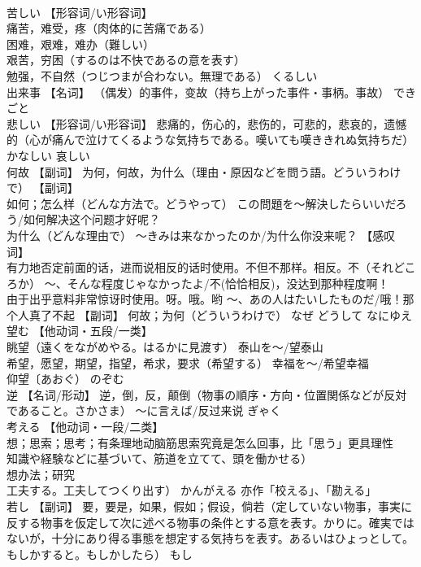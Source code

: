 \documentclass[8pt]{extreport}
\begin{document}
\begin{CJK}{UTF8}{min}
\\	苦しい	【形容词/い形容词】 
\\	痛苦，难受，疼（肉体的に苦痛である） 
\\	困难，艰难，难办（難しい） 
\\	艰苦，穷困（するのは不快であるの意を表す） 
\\	勉强，不自然（つじつまが合わない。無理である）	くるしい	
\\	出来事	【名词】 （偶发）的事件，变故（持ち上がった事件・事柄。事故）	できごと	
\\	悲しい	【形容词/い形容词】 悲痛的，伤心的，悲伤的，可悲的，悲哀的，遗憾的（心が痛んで泣けてくるような気持ちである。嘆いても嘆ききれぬ気持ちだ）	かなしい	哀しい
\\	何故	【副词】 为何，何故，为什么（理由・原因などを問う語。どういうわけで） 【副词】 
\\	如何；怎么样（どんな方法で。どうやって） この問題を～解決したらいいだろう/如何解决这个问题才好呢？ 
\\	为什么（どんな理由で） ～きみは来なかったのか/为什么你没来呢？ 【感叹词】 
\\	有力地否定前面的话，进而说相反的话时使用。不但不那样。相反。不（それどころか） ～、そんな程度じゃなかったよ/不(恰恰相反)，没达到那种程度啊！ 
\\	由于出乎意料非常惊讶时使用。呀。哦。哟 ～、あの人はたいしたものだ/哦！那个人真了不起 【副词】 何故；为何（どういうわけで）	なぜ どうして なにゆえ	
\\	望む	【他动词・五段/一类】 
\\	眺望（遠くをながめやる。はるかに見渡す） 泰山を〜/望泰山 
\\	希望，愿望，期望，指望，希求，要求（希望する） 幸福を〜/希望幸福 
\\	仰望〔あおぐ）	のぞむ	
\\	逆	【名词/形动】 逆，倒，反，颠倒（物事の順序・方向・位置関係などが反対であること。さかさま） 〜に言えば/反过来说	ぎゃく	
\\	考える	【他动词・一段/二类】 
\\	想；思索；思考；有条理地动脑筋思索究竟是怎么回事，比「思う」更具理性
\\	知識や経験などに基づいて、筋道を立てて、頭を働かせる） 
\\	想办法；研究
\\	工夫する。工夫してつくり出す）	かんがえる	亦作「校える」、「勘える」
\\	若し	【副词】 要，要是，如果，假如；假设，倘若（定していない物事，事実に反する物事を仮定して次に述べる物事の条件とする意を表す。かりに。確実ではないが，十分にあり得る事態を想定する気持ちを表す。あるいはひょっとして。もしかすると。もしかしたら）	もし	

\end{CJK}
\end{document}
